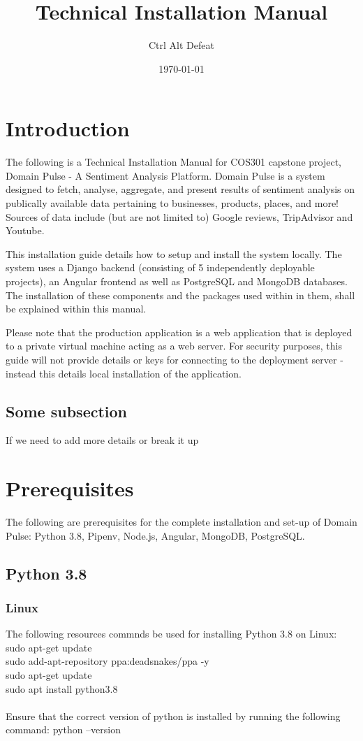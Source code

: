 \documentclass{article}
\title{Technical Installation Manual}
\author{Ctrl Alt Defeat}
\date{\today}
\begin{document}
\maketitle


\section{Introduction}
The following is a Technical Installation Manual for COS301 capstone project, Domain Pulse - A Sentiment Analysis Platform. Domain Pulse is
a system designed to fetch, analyse, aggregate, and present results of sentiment analysis on publically available data pertaining to
businesses, products, places, and more! Sources of data include (but are not limited to) Google reviews, TripAdvisor and Youtube.

This installation guide details how to setup and install the system locally. The system uses a Django backend (consisting of 5 independently deployable projects),
an Angular frontend as well as PostgreSQL and MongoDB databases. The installation of these components and the packages used within in
them, shall be explained within this manual.

Please note that the production application is a web application that is deployed to a private virtual machine acting as a web server. For
security purposes, this guide will not provide details or keys for connecting to the deployment server - instead this details local installation
of the application.

\subsection{Some subsection}
If we need to add more details or break it up

\section{Prerequisites}
The following are prerequisites for the complete installation and set-up of Domain Pulse: Python 3.8, Pipenv, Node.js, Angular, MongoDB, PostgreSQL.

\subsection{Python 3.8}
\subsubsection{Linux}
The following resources commnds be used for installing Python 3.8 on Linux:\\
sudo apt-get update\\
sudo add-apt-repository ppa:deadsnakes/ppa -y\\
sudo apt-get update\\
sudo apt install python3.8\\ \\
Ensure that the correct version of python is installed by running the following command:
python --version
\end{document}
